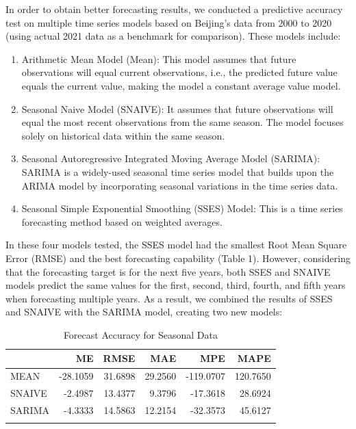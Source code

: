 \documentclass[
  12pt,
]{article}
\providecommand{\tightlist}{%
  \setlength{\itemsep}{0pt}\setlength{\parskip}{0pt}}
\begin{document}
In order to obtain better forecasting results, we conducted a predictive
accuracy test on multiple time series models based on Beijing's data
from 2000 to 2020 (using actual 2021 data as a benchmark for
comparison). These models include:

\begin{enumerate}
\def\labelenumi{\arabic{enumi}.}
\tightlist
\item
  Arithmetic Mean Model (Mean): This model assumes that future
  observations will equal current observations, i.e., the predicted
  future value equals the current value, making the model a constant
  average value model.
\item
  Seasonal Naive Model (SNAIVE): It assumes that future observations
  will equal the most recent observations from the same season. The
  model focuses solely on historical data within the same season.
\item
  Seasonal Autoregressive Integrated Moving Average Model (SARIMA):
  SARIMA is a widely-used seasonal time series model that builds upon
  the ARIMA model by incorporating seasonal variations in the time
  series data.
\item
  Seasonal Simple Exponential Smoothing (SSES) Model: This is a time
  series forecasting method based on weighted averages.
\end{enumerate}

In these four models tested, the SSES model had the smallest Root Mean
Square Error (RMSE) and the best forecasting capability (Table 1).
However, considering that the forecasting target is for the next five
years, both SSES and SNAIVE models predict the same values for the
first, second, third, fourth, and fifth years when forecasting multiple
years. As a result, we combined the results of SSES and SNAIVE with the
SARIMA model, creating two new models:

\begin{table}

\caption{\label{tab:accuacy_table1}Forecast Accuracy for Seasonal Data}
\centering
\begin{tabular}[t]{l|r|r|r|r|r}
\hline
  & ME & RMSE & MAE & MPE & MAPE\\
\hline
MEAN & -28.1059 & 31.6898 & 29.2560 & -119.0707 & 120.7650\\
\hline
SNAIVE & -2.4987 & 13.4377 & 9.3796 & -17.3618 & 28.6924\\
\hline
SARIMA & -4.3333 & 14.5863 & 12.2154 & -32.3573 & 45.6127\\
\hline
\cellcolor{gray!6}{SSES} & \cellcolor{gray!6}{4.8008} & \cellcolor{gray!6}{12.3008} & \cellcolor{gray!6}{7.7936} & \cellcolor{gray!6}{5.2446} & \cellcolor{gray!6}{19.6416}\\
\hline
\end{tabular}
\end{table}
\end{document}
